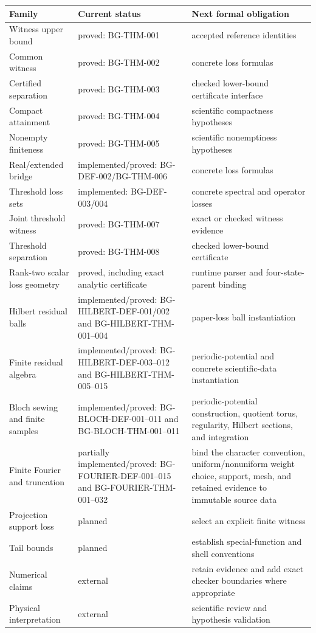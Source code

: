 \documentclass[11pt]{article}
\begin{document}
\begingroup
\small
\begin{tabularx}{\textwidth}{@{}>{\raggedright\arraybackslash}p{}>{\raggedright\arraybackslash}p{}>{\raggedright\arraybackslash}X@{}}
\toprule
Family & Current status & Next formal obligation \\
\midrule
Witness upper bound & proved: BG-THM-001 & accepted reference identities \\
Common witness & proved: BG-THM-002 & concrete loss formulas \\
Certified separation & proved: BG-THM-003 & checked lower-bound certificate interface \\
Compact attainment & proved: BG-THM-004 & scientific compactness hypotheses \\
Nonempty finiteness & proved: BG-THM-005 & scientific nonemptiness hypotheses \\
Real/extended bridge & implemented/proved: BG-DEF-002/BG-THM-006 & concrete loss formulas \\
Threshold loss sets & implemented: BG-DEF-003/004 & concrete spectral and operator losses \\
Joint threshold witness & proved: BG-THM-007 & exact or checked witness evidence \\
Threshold separation & proved: BG-THM-008 & checked lower-bound certificate \\
Rank-two scalar loss geometry & proved, including exact analytic certificate & runtime parser and four-state-parent binding \\
Hilbert residual balls & implemented/proved: BG-HILBERT-DEF-001/002 and BG-HILBERT-THM-001--004 & paper-loss ball instantiation \\
Finite residual algebra & implemented/proved: BG-HILBERT-DEF-003--012 and BG-HILBERT-THM-005--015 & periodic-potential and concrete scientific-data instantiation \\
Bloch sewing and finite samples & implemented/proved: BG-BLOCH-DEF-001--011 and BG-BLOCH-THM-001--011 & periodic-potential construction, quotient torus, regularity, Hilbert sections, and integration \\
Finite Fourier and truncation & partially implemented/proved: BG-FOURIER-DEF-001--015 and BG-FOURIER-THM-001--032 & bind the character convention, uniform/nonuniform weight choice, support, mesh, and retained evidence to immutable source data \\
Projection support loss & planned & select an explicit finite witness \\
Tail bounds & planned & establish special-function and shell conventions \\
Numerical claims & external & retain evidence and add exact checker boundaries where appropriate \\
Physical interpretation & external & scientific review and hypothesis validation \\
\bottomrule
\end{tabularx}
\endgroup
\end{document}
